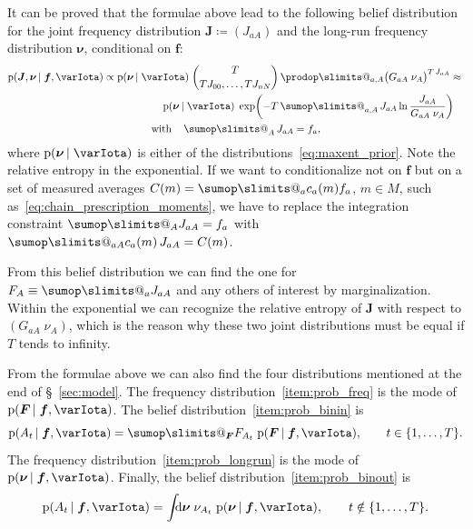 \documentclass[\ifafour a4paper,12pt,\else a5paper,10pt,\fi%
onecolumn,oneside,article,%
british%
]{memoir}
\makeatletter
\theoremstyle{remark}
\theoremstyle{innote}
\def\sum{\DOTSI\sumop\slimits@}
\def\prod{\DOTSI\prodop\slimits@}
\newcommand*{\di}{\mathrm{d}}%
\newcommand*{\defd}{\coloneqq}
\DeclarePairedDelimiter\set{\{}{\}}
\newcommand*{\pf}{\mathrm{p}}%
\renewcommand*{\|}{\nonscript\,\vert\nonscript\;\mathopen{}}
\newcommand*{\sect}{\S}%
\newcommand*{\tsum}{\mathop{\textstyle\sum}\nolimits}
\newcommand*{\yG}{G}
\newcommand*{\yAv}{A}
\newcommand*{\yav}{a}
\newcommand*{\yFF}{F}
\newcommand*{\yff}{f}
\newcommand*{\yF}{\bm{\yFF}}
\newcommand*{\yf}{\bm{\yff}}
\newcommand*{\ya}{\yav}%
\newcommand*{\yA}{\yAv}%
\newcommand*{\yI}{\varIota}
\newcommand*{\ynuu}{\nu}
\newcommand*{\ynu}{\bm{\ynuu}}
\newcommand*{\yJ}{\bm{J}}
\makeatother
\begin{document}
It can be proved that the formulae above lead to the following belief
distribution for the joint frequency distribution $\yJ \defd (J_{\ya\yA})$
and the long-run frequency distribution $\ynu$, conditional on $\yf$:
\begin{multline}
  \label{eq:prob_joint_frequencies}
  \pf(\yJ, \ynu \| \yf, \yI) \propto
  \pf(\ynu\|\yI)\;
                         \binom{T}{TJ_{0 0},\dotsc,TJ_{n N}}\,
                         \prod_{\ya,\yA}\bigl(\yG_{\ya\yA}\;\nu_{\yA}\bigr)^{T\,J_{\ya\yA}}
  \approx{}  \\
  \shoveright{%
    \pf(\ynu\|\yI)\;
                         \exp\biggl(
-T \tsum_{\ya,\yA}J_{\ya\yA}\ln\frac{J_{\ya\yA}}{\yG_{\ya\yA}\;\nu_{\yA}}
                         \biggr)}
  \\
  \text{with}\quad \tsum_{\yA}J_{\ya\yA}=\yff_{\ya},
\end{multline}
where $\pf(\ynu\|\yI)$ is either of the
distributions~\eqref{eq:maxent_prior}. Note the relative entropy in the
exponential. If we want to conditionalize not on $\yf$ but on a set of
measured averages $C(m) = \sum_{\ya}c_{\ya}(m) \yff_{\ya}$, $m\in M$, such
as~\eqref{eq:chain_prescription_moments}, we have to replace the
integration constraint $\sum_{\yA}J_{\ya\yA}=\yff_{\ya}$ with
$\sum_{\ya\yA}c_{\ya}(m)\,J_{\ya\yA}=C(m)$.

From this belief distribution we can find the one for
$\yFF_{\yA}\equiv \sum_{\ya}J_{\ya\yA}$ and any others of interest by
marginalization. Within the exponential we can recognize the relative
entropy of $\yJ$ with respect to $(\yG_{\ya\yA}\;\nu_{\yA})$, which is the
reason why these two joint distributions must be equal if $T$ tends to
infinity.

From the formulae above we can also find the four distributions mentioned
at the end of \sect~\ref{sec:model}. The frequency
distribution~\ref{item:prob_freq} is the mode of $\pf(\yF \| \yf,\yI)$. The
belief distribution~\ref{item:prob_binin} is
\begin{equation}
  \label{eq:prob_binin}
  \pf(\yA_{t} \| \yf, \yI) =
  \sum_{\yF} \yFF_{\yA_{t}}\; \pf(\yF \| \yf, \yI),
  \qquad t \in \set{1,\dotsc,T}.
\end{equation}
The frequency distribution~\ref{item:prob_longrun} is the mode of $\pf(\ynu
\| \yf,\yI)$. Finally, the belief distribution~\ref{item:prob_binout} is
\begin{equation}
  \label{eq:prob_binout}
  \pf(\yA_{t} \| \yf, \yI) =
  \int\!\!\!\di\ynu\;\nu_{\yA_{t}}\;\pf(\ynu \| \yf, \yI),
  \qquad t \notin \set{1,\dotsc,T}.
\end{equation}
\end{document}
